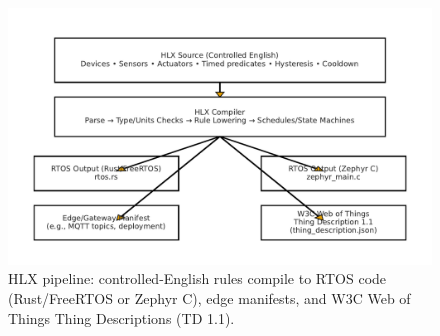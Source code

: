 \begin{figure}[t]
\centering
\includegraphics[width=\linewidth]{hlx_pipeline.pdf}
\caption{HLX pipeline: controlled-English rules compile to RTOS code (Rust/FreeRTOS or Zephyr C), edge manifests, and W3C Web of Things Thing Descriptions (TD 1.1).}
\label{fig:pipeline}
\end{figure}
